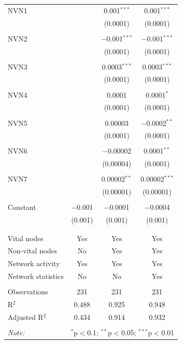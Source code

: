 \begin{table}[!htbp]
\begin{tabular}{@{\extracolsep{5pt}}lccc}
 NVN1 &  & 0.001$^{***}$ & 0.001$^{***}$ \\ 
  &  & (0.0001) & (0.0001) \\ 
  & & & \\ 
 NVN2 &  & $-$0.001$^{***}$ & $-$0.001$^{***}$ \\ 
  &  & (0.0001) & (0.0001) \\ 
  & & & \\ 
 NVN3 &  & 0.0003$^{***}$ & 0.0003$^{***}$ \\ 
  &  & (0.0001) & (0.0001) \\ 
  & & & \\ 
 NVN4 &  & 0.0001 & 0.0001$^{*}$ \\ 
  &  & (0.0001) & (0.0001) \\ 
  & & & \\ 
 NVN5 &  & 0.00003 & $-$0.0002$^{**}$ \\ 
  &  & (0.0001) & (0.0001) \\ 
  & & & \\ 
 NVN6 &  & $-$0.00002 & 0.0001$^{**}$ \\ 
  &  & (0.00004) & (0.0001) \\ 
  & & & \\ 
 NVN7 &  & 0.00002$^{**}$ & 0.00002$^{***}$ \\ 
  &  & (0.00001) & (0.00001) \\ 
  & & & \\ 
 Constant & $-$0.001 & $-$0.0001 & $-$0.0004 \\ 
  & (0.001) & (0.001) & (0.001) \\ 
  & & & \\ 
\hline \\[-1.8ex] 
Vital nodes & Yes & Yes & Yes \\ 
Non-vital nodes & No & Yes & Yes \\ 
Network activity & Yes & Yes & Yes \\ 
Network statistics & No & No & Yes \\ 
\hline &  &  &  \\ 
Observations & 231 & 231 & 231 \\ 
R$^{2}$ & 0.488 & 0.925 & 0.948 \\ 
Adjusted R$^{2}$ & 0.434 & 0.914 & 0.932 \\ 
\hline 
\hline \\[-1.8ex] 
\textit{Note:}  & \multicolumn{3}{r}{$^{*}$p$<$0.1; $^{**}$p$<$0.05; $^{***}$p$<$0.01} \\ 
\end{tabular} 
\end{table} 
